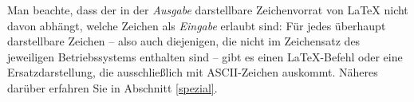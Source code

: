 Man beachte, dass der in der \emph{Ausgabe} darstellbare Zeichenvorrat 
von \LaTeX{} nicht davon abhängt, welche Zeichen als \emph{Eingabe} erlaubt 
sind:
Für jedes überhaupt darstellbare Zeichen -- also auch diejenigen, die
nicht im Zeichensatz des jeweiligen Betriebssystems enthalten sind --
gibt es einen 
\LaTeX-Befehl oder eine Ersatzdarstellung, die ausschließlich mit 
ASCII-Zeichen auskommt.  Näheres darüber erfahren Sie
in Abschnitt \ref{spezial}.



\endinput
